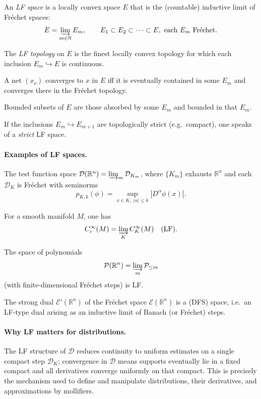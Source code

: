 \documentclass[12pt,a4paper]{article}
\theoremstyle{plain}
\theoremstyle{definition}
\theoremstyle{remark}
\theoremstyle{remark}
\begin{document}
\smallskip

An \emph{LF space} is a locally convex space $E$ that is the (countable) inductive limit of Fr\'echet spaces:
\[
E=\varinjlim_{m\in\mathbb N} E_m, \qquad
E_1 \subset E_2 \subset \cdots \subset E, \ \text{each $E_m$ Fr\'echet.}
\]

\smallskip

The \emph{LF topology} on $E$ is the finest locally convex topology for which each inclusion
$E_m \hookrightarrow E$ is continuous.

\smallskip

A net $(x_\nu)$ converges to $x$ in $E$ iff it is eventually contained in some $E_m$
and converges there in the Fr\'echet topology.

\smallskip

Bounded subsets of $E$ are those absorbed by some $E_m$ and bounded in that $E_m$.

\smallskip

If the inclusions $E_m \hookrightarrow E_{m+1}$ are topologically strict (e.g.\ compact),
one speaks of a \emph{strict} LF space.

\bigskip

\paragraph{Examples of LF spaces.}

\smallskip

The test function space $\mathcal D(\mathbb R^n)
= \varinjlim_m \mathcal D_{K_m}$, where $\{K_m\}$ exhausts $\mathbb R^n$
and each $\mathcal D_{K}$ is Fr\'echet with seminorms
\[
p_{K,k}(\phi)=\sup_{x\in K,\;|\alpha|\le k} |D^\alpha \phi(x)|.
\]

\smallskip

For a smooth manifold $M$, one has
\[
C_c^\infty(M)=\varinjlim_{K} C^\infty_{K}(M) \quad \text{(LF).}
\]

\smallskip

The space of polynomials
\[
\mathcal P(\mathbb R^n)=\varinjlim_m \mathcal P_{\le m}
\]
(with finite-dimensional Fr\'echet steps) is LF.

\smallskip

The strong dual $\mathcal E'(\mathbb R^n)$ of the Fr\'echet space $\mathcal E(\mathbb R^n)$
is a (DFS) space, i.e.\ an LF-type dual arising as an inductive limit of Banach (or Fr\'echet) steps.

\medskip


\paragraph{Why LF matters for distributions.}
The LF structure of $\mathcal D$ reduces continuity to uniform estimates on a single compact step $\mathcal D_K$;
convergence in $\mathcal D$ means supports eventually lie in a fixed compact and all derivatives converge uniformly on that compact.
This is precisely the mechanism used to define and manipulate distributions, their derivatives, and approximations by mollifiers.
\end{document}

